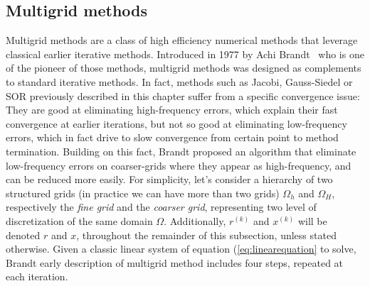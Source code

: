 \subsection{Multigrid methods}

Multigrid methods are a class of high efficiency numerical methods that leverage classical earlier iterative methods. Introduced in 1977 by Achi Brandt~\cite{brandt_multi-level_1977} who is one of the pioneer of those methods, multigrid methods was designed as complements to standard iterative methods. In fact, methods such as Jacobi, Gauss-Siedel or SOR previously described in this chapter suffer from a specific convergence issue: They are good at eliminating high-frequency errors, which explain their fast convergence at earlier iterations, but not so good at eliminating low-frequency errors, which in fact drive to slow convergence from certain point to method termination. Building on this fact, Brandt proposed an algorithm that eliminate low-frequency errors on coarser-grids where they appear as high-frequency, and can be reduced more easily. For simplicity, let's consider a hierarchy of two  structured grids (in practice we can have more than two grids) $\Omega_h$ and $\Omega_H$, respectively the \textit{fine grid} and the \textit{coarser grid}, representing two level of discretization of the same domain $\Omega$. Additionally, $r^{(k)}$ and $x^{(k)}$ will be denoted $r$ and $x$, throughout the remainder of this subsection, unless stated otherwise.  Given a classic linear system of equation (\ref{eq:linearequation} to solve, Brandt early description of multigrid method includes four steps, repeated at each iteration.

